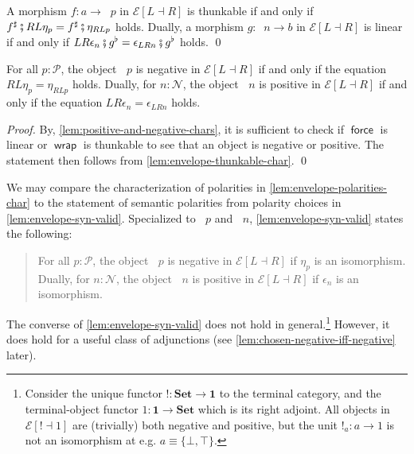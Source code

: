 \documentclass[runningheads]{llncs}
\newcommand*\rocqlogo{\usebox{\rocqlogobox}}
\newcommand{\lemmaref}[3]{\href{https://github.com/UniMath/UniMath/blob/94fae0eda57a778cec704bfa73b4ff525c9bc475/#1\#L#2?name=#3}{\rocqlogo}}
\newcommand{\acat}[1]{\mathcal{#1}}
\newcommand{\PP}{\acat{P}}
\newcommand{\NN}{\acat{N}}
\newcommand{\EE}{\acat{E}}
\newcommand{\wkcat}[1]{\mathbf{#1}}
\newcommand{\Setcat}{\wkcat{Set}}
\newcommand{\Terminal}{\wkcat{1}}
\newcommand{\Env}[1]{\EE[#1]}
\newcommand{\dcomp}{\fatsemi}
\newcommand{\force}{\mathop{\mathsf{force}}\nolimits}
\newcommand{\wrap}{\mathop{\mathsf{wrap}}\nolimits}
\newcommand{\inneg}{\mathop{\iota^{\ominus}}}
\newcommand{\inpos}{\mathop{\iota^{\oplus}}}
\newcommand{\innegE}{\mathop{\iota^{\ominus}_{\EE}}}
\newcommand{\inposE}{\mathop{\iota^{\oplus}_{\EE}}}
\begin{document}
\begin{lemma}[{\lemmaref{UniMath/CategoryTheory/Nonassociative/Duploids/FromAdjunction/Envelope.v}{768}{is\_thunkable\_from\_downshift\_iff\_envelope\_unit\_postcompose} \cite[Proposition 14]{MunchMaccagnoni14}}]
\label{lem:envelope-thunkable-char}
A morphism \(f \colon a \to \inposE{p}\) in \(\Env{L \dashv R}\) is
thunkable if and only if \(f^\sharp \dcomp RL\eta_p = f^\sharp \dcomp
\eta_{RLp}\) holds. Dually, a morphism \(g \colon \innegE{n} \to b\)
in \(\Env{L \dashv R}\) is linear if and only if \(LR\epsilon_n \dcomp
g^\flat = \epsilon_{LRn} \dcomp g^\flat\) holds.
\qed
\end{lemma}

\begin{theorem}[{\lemmaref{UniMath/CategoryTheory/Nonassociative/Duploids/FromAdjunction/Envelope.v}{836}{is\_negative\_envelope\_downshift\_iff\_pre\_fixed\_point}}]
\label{lem:envelope-polarities-char}
For all \(p : \PP\), the object \(\inpos{p}\) is negative in \(\Env{L
\dashv R}\) if and only if the equation \(RL\eta_p = \eta_{RLp}\) holds.
Dually, for \(n : \NN\), the object \(\inneg{n}\) is positive in
\(\Env{L \dashv R}\) if and only if the equation \(LR\epsilon_n =
\epsilon_{LRn}\) holds.
\end{theorem}
\begin{proof}
By, \autoref{lem:positive-and-negative-chars}, it is sufficient to check if
\(\force\) is linear or \(\wrap\) is thunkable to see that an object
is negative or positive. The statement then follows from
\autoref{lem:envelope-thunkable-char}.
\qed
\end{proof}

\begin{remark}
\label{rem:envelope-syn-polarities-char}
We may compare the characterization of polarities in
\autoref{lem:envelope-polarities-char} to the statement of semantic polarities
from polarity choices in \autoref{lem:envelope-syn-valid}. Specialized to
\(\inpos{p}\) and \(\inneg{n}\), \autoref{lem:envelope-syn-valid} states the
following:

\begin{quote}
For all \(p : \PP\), the object \(\inpos{p}\) is negative in \(\Env{L
\dashv R}\) if \(\eta_p\) is an isomorphism. Dually, for \(n : \NN\),
the object \(\inneg{n}\) is positive in \(\Env{L \dashv R}\) if
\(\epsilon_n\) is an isomorphism.
\end{quote}

The converse of \autoref{lem:envelope-syn-valid} does not hold in general.\footnote{Consider the unique functor \(\mathbf! : \Setcat \to \Terminal\) to the terminal
category, and the terminal\hyp{}object functor \(1 : \Terminal \to \Setcat\)
which is its right adjoint.  All objects in \(\Env{\mathbf! \dashv
1}\) are (trivially) both negative and positive, but the unit \(!_a
\colon a \to 1\) is not an isomorphism at e.g. \(a \equiv \{\bot, \top\}\).}
However, it does hold for a useful class of adjunctions (see
\autoref{lem:chosen-negative-iff-negative} later).
\end{remark}
\end{document}
